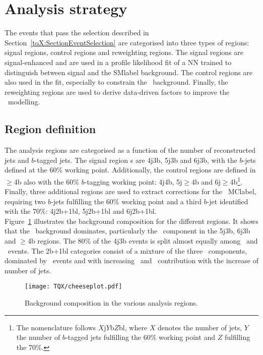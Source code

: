 \section{Analysis strategy}
The events that pass the selection described in Section~\ref{tqX:SectionEventSelection} are categorised into three types of regions: signal regions, control regions and reweighting regions. The signal regions are signal-enhanced and are used in a profile likelihood fit of a NN trained to distinguish between signal and the \acrshort{SMlabel} background. The control regions are also used in the fit, especially to constrain the \ttb\ background. Finally, the reweighting regions are used to derive data-driven factors to improve the \ttbar\ modelling.

\subsection{Region definition}

The analysis regions are categorised as a function of the number of reconstructed jets and $b$-tagged jets. The signal region   s are 4j3b, 5j3b and 6j3b, with the $b$-jets defined at the 60\% working point. Additionally, the control regions are defined in $\geq$4b also with the 60\% $b$-tagging working point: 4j4b, 5j$\geq$4b and 6j$\geq$4b\footnote{The nomenclature follows $X$j$Y$b$Z$bl, where $X$ denotes the number of jets, $Y$ the number of $b$-tagged jets fulfilling the 60\% working point and $Z$ fulfilling the 70\%.}. Finally, three additional regions are used to extract corrections for the \ttbar\ \acrshort{MClabel}, requiring two $b$-jets fulfilling the 60\% working point and a third $b$-jet identified with the 70\%: 4j2b+1bl, 5j2b+1bl and 6j2b+1bl.\\

Figure~\ref{tqX:cheeseplots} illustrates the background composition for the different regions. It shows that the \ttbar\ background dominates, particularly the \ttb\ component in the 5j3b, 6j3b and $\geq$4b regions. The 80\% of the 4j3b events is split almost equally among \ttb\ and \ttl\ events. The 2b+1bl categories consist of a mixture of the three \ttbar\ components, dominated by \ttl\ events and with increasing \ttc\ and \ttb\ contribution with the increase of number of jets.\\

\begin{figure}[htbp]
    \RawFloats
    \begin{center}
    \texttt{[image: TQX/cheeseplot.pdf]}
    \caption{
        Background composition in the various analysis regions.
    }
    \label{tqX:cheeseplots}
    \end{center}
\end{figure}

